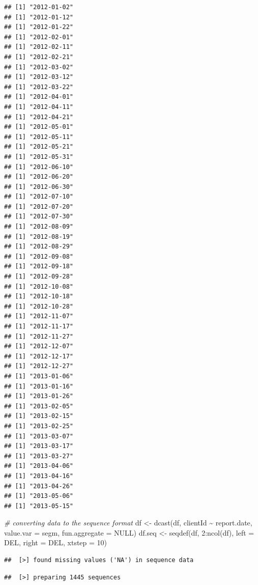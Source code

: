 \documentclass[
]{book}
\newenvironment{Shaded}{\begin{snugshade}}{\end{snugshade}}
\newcommand{\AttributeTok}[1]{\textcolor[rgb]{0.77,0.63,0.00}{#1}}
\newcommand{\CommentTok}[1]{\textcolor[rgb]{0.56,0.35,0.01}{\textit{#1}}}
\newcommand{\ConstantTok}[1]{\textcolor[rgb]{0.00,0.00,0.00}{#1}}
\newcommand{\DecValTok}[1]{\textcolor[rgb]{0.00,0.00,0.81}{#1}}
\newcommand{\FunctionTok}[1]{\textcolor[rgb]{0.00,0.00,0.00}{#1}}
\newcommand{\NormalTok}[1]{#1}
\newcommand{\OtherTok}[1]{\textcolor[rgb]{0.56,0.35,0.01}{#1}}
\newcommand{\SpecialCharTok}[1]{\textcolor[rgb]{0.00,0.00,0.00}{#1}}
\newcommand{\StringTok}[1]{\textcolor[rgb]{0.31,0.60,0.02}{#1}}
\begin{document}
\begin{verbatim}
## [1] "2012-01-02"
## [1] "2012-01-12"
## [1] "2012-01-22"
## [1] "2012-02-01"
## [1] "2012-02-11"
## [1] "2012-02-21"
## [1] "2012-03-02"
## [1] "2012-03-12"
## [1] "2012-03-22"
## [1] "2012-04-01"
## [1] "2012-04-11"
## [1] "2012-04-21"
## [1] "2012-05-01"
## [1] "2012-05-11"
## [1] "2012-05-21"
## [1] "2012-05-31"
## [1] "2012-06-10"
## [1] "2012-06-20"
## [1] "2012-06-30"
## [1] "2012-07-10"
## [1] "2012-07-20"
## [1] "2012-07-30"
## [1] "2012-08-09"
## [1] "2012-08-19"
## [1] "2012-08-29"
## [1] "2012-09-08"
## [1] "2012-09-18"
## [1] "2012-09-28"
## [1] "2012-10-08"
## [1] "2012-10-18"
## [1] "2012-10-28"
## [1] "2012-11-07"
## [1] "2012-11-17"
## [1] "2012-11-27"
## [1] "2012-12-07"
## [1] "2012-12-17"
## [1] "2012-12-27"
## [1] "2013-01-06"
## [1] "2013-01-16"
## [1] "2013-01-26"
## [1] "2013-02-05"
## [1] "2013-02-15"
## [1] "2013-02-25"
## [1] "2013-03-07"
## [1] "2013-03-17"
## [1] "2013-03-27"
## [1] "2013-04-06"
## [1] "2013-04-16"
## [1] "2013-04-26"
## [1] "2013-05-06"
## [1] "2013-05-15"
\end{verbatim}

\begin{Shaded}
\begin{Highlighting}[]
\CommentTok{\# converting data to the sequence format}
\NormalTok{df }\OtherTok{\textless{}{-}}
    \FunctionTok{dcast}\NormalTok{(df,}
\NormalTok{          clientId }\SpecialCharTok{\textasciitilde{}}\NormalTok{ report.date,}
          \AttributeTok{value.var =} \StringTok{\textquotesingle{}segm\textquotesingle{}}\NormalTok{,}
          \AttributeTok{fun.aggregate =} \ConstantTok{NULL}\NormalTok{)}
\NormalTok{df.seq }\OtherTok{\textless{}{-}} \FunctionTok{seqdef}\NormalTok{(df,}
                 \DecValTok{2}\SpecialCharTok{:}\FunctionTok{ncol}\NormalTok{(df),}
                 \AttributeTok{left =} \StringTok{\textquotesingle{}DEL\textquotesingle{}}\NormalTok{,}
                 \AttributeTok{right =} \StringTok{\textquotesingle{}DEL\textquotesingle{}}\NormalTok{,}
                 \AttributeTok{xtstep =} \DecValTok{10}\NormalTok{)}
\end{Highlighting}
\end{Shaded}

\begin{verbatim}
##  [>] found missing values ('NA') in sequence data
\end{verbatim}

\begin{verbatim}
##  [>] preparing 1445 sequences
\end{verbatim}
\end{document}
